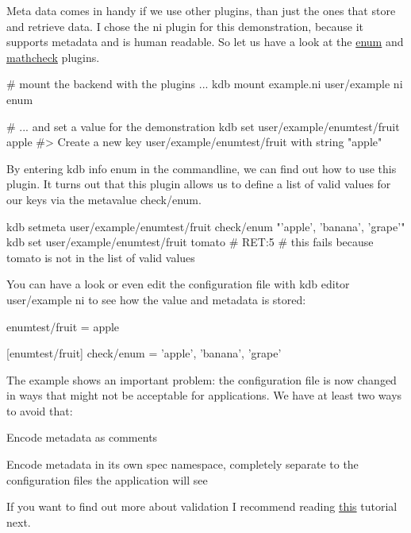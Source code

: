 Meta data comes in handy if we use other plugins, than just the ones that store and retrieve data. I chose the {\ttfamily ni} plugin for this demonstration, because it supports metadata and is human readable. So let us have a look at the \hyperlink{md_src_plugins_enum_README_src_plugins_enum_README_md}{enum} and \hyperlink{md_src_plugins_mathcheck_README_src_plugins_mathcheck_README_md}{mathcheck} plugins.


\begin{DoxyCode}
# mount the backend with the plugins ...
kdb mount example.ni user/example ni enum

# ... and set a value for the demonstration
kdb set user/example/enumtest/fruit apple
#> Create a new key user/example/enumtest/fruit with string "apple"
\end{DoxyCode}


By entering {\ttfamily kdb info enum} in the commandline, we can find out how to use this plugin. It turns out that this plugin allows us to define a list of valid values for our keys via the metavalue {\ttfamily check/enum}.


\begin{DoxyCode}
kdb setmeta user/example/enumtest/fruit check/enum "'apple', 'banana', 'grape'"
kdb set user/example/enumtest/fruit tomato
# RET:5
# this fails because tomato is not in the list of valid values
\end{DoxyCode}


You can have a look or even edit the configuration file with {\ttfamily kdb editor user/example ni} to see how the value and metadata is stored\+:


\begin{DoxyCode}
enumtest/fruit = apple

[enumtest/fruit]
check/enum = 'apple', 'banana', 'grape'
\end{DoxyCode}


The example shows an important problem\+: the configuration file is now changed in ways that might not be acceptable for applications. We have at least two ways to avoid that\+:


\begin{DoxyEnumerate}
\item Encode metadata as comments
\item Encode metadata in its own {\ttfamily spec} namespace, completely separate to the configuration files the application will see
\end{DoxyEnumerate}

If you want to find out more about validation I recommend reading \hyperlink{md_doc_tutorials_validation_doc_tutorials_validation_md}{this} tutorial next.

